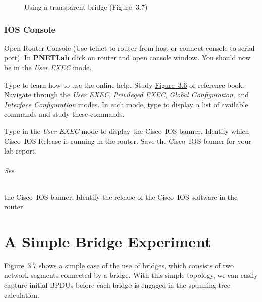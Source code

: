 \documentclass{../UTNetLab}
\begin{document}
\begin{figure}[H]
    \centering
    \caption{Using a transparent bridge (Figure~3.7)}\label{fig:3.7}
\end{figure}


\section{IOS Console}
Open Router Console (Use telnet to router from host or connect console to serial port).
In \textbf{PNETLab} click on router and open console window.
You should now be in the \textit{User EXEC} mode.

Type  to learn how to use the online help.
Study \hyperref[fig:3.6]{Figure~3.6} of reference book.
Navigate through the \textit{User EXEC}, \textit{Privileged EXEC}, \textit{Global Configuration}, and \textit{Interface Configuration} modes.
In each mode, type  to display a list of available commands and study these commands.

Type  in the \textit{User EXEC} mode to display the Cisco~IOS banner.
Identify which Cisco~IOS Release is running in the router.
Save the Cisco~IOS banner for your lab report.

\paragraph{See} the Cisco~IOS banner.
Identify the release of the Cisco~IOS software in the router.

\part{A Simple Bridge Experiment}
\hyperref[fig:3.7]{Figure~3.7} shows a simple case of the use of bridges, which consists of two network segments connected by a bridge.
With this simple topology, we can easily capture initial BPDUs before each bridge is engaged in the spanning tree calculation.
\end{document}
